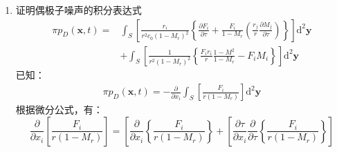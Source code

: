 \begin{enumerate}
    \item 证明偶极子噪声的积分表达式
        \begin{equation*}
            \begin{aligned}
                \pi p_{D}(\mathbf{x}, t)
                =& \int_{S}\left[\frac{r_{i}}{r^{2} c_{0}\left(1-M_{r}\right)^{2}}\left\{\frac{\partial F_{i}}{\partial \tau}+\frac{F_{i}}{1-M_{r}}\left(\frac{r_{j}}{r} \frac{\partial M_{j}}{\partial \tau}\right)\right\}\right] \mathrm{d}^{2} \mathbf{y} \\
                &+\int_{S}\left[\frac{1}{r^{2}\left(1-M_{r}\right)^{2}}\left\{\frac{F_{i} r_{i}}{r} \frac{1-M^{2}}{1-M_{r}}-F_{i} M_{i}\right\}\right] \mathrm{d}^{2} \mathbf{y}
            \end{aligned}
        \end{equation*}
    已知：
    \begin{equation}
        \begin{aligned}
            \pi p_{D}(\mathbf{x}, t)
            = -\frac{\partial}{\partial x_{i}} \int_{S}\left[\frac{F_{i}}{r\left(1-M_{r}\right)}\right] \mathrm{d}^{2} \mathbf{y}
        \end{aligned}
    \end{equation}
    根据微分公式，有：
    \begin{equation}
        \frac{\partial}{\partial x_{i}} \left[\frac{F_{i}}{r\left(1-M_{r}\right)}\right]
        = \left[\frac{\partial}{\partial x_{i}}\left\{\frac{F_{i}}{r\left(1-M_{r}\right)}\right\}+\left[\frac{\partial \tau}{\partial x_{i}}\right.\right.  \left.\frac{\partial}{\partial \tau}\left\{\frac{F_{i}}{r\left(1-M_{r}\right)}\right\}\right]
    \end{equation}

\end{enumerate}

\clearpage